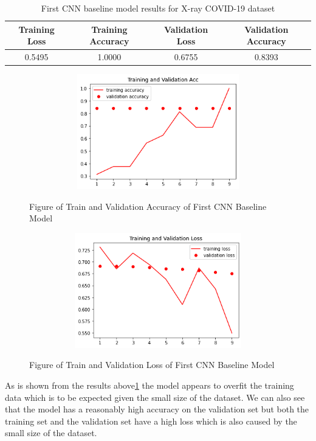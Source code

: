 \begin{table}[H]
    \centering
    \begin{tabular}{|c|c|c|c|}
    \hline
         Training Loss
         & Training Accuracy 
         & Validation Loss
         & Validation Accuracy\\
         \hline
         0.5495  & 1.0000 & 0.6755 & 0.8393\\
         \hline
    \end{tabular}
    \caption{First CNN baseline model results for X-ray COVID-19 dataset}
    \label{tab:First CNN baseline model results for X-ray COVID-19 dataset}
\end{table}
 \begin{figure}[H]
    \centering
    \includegraphics[width=1\textwidth,height=5cm,keepaspectratio]{Images/FirstCNNBaselineTrainAndValAcc.PNG}\\
    \caption{Figure of Train and Validation Accuracy of First CNN Baseline Model}
    \label{fig:First CNN Baseline Train and Validation Accuracy}
\end{figure}
 \begin{figure}[H]
    \centering
    \includegraphics[width=1\textwidth,height=5cm,keepaspectratio]{Images/FirstCNNBaselineTrainAndValLoss.PNG}\\
    \caption{Figure of Train and Validation Loss of First CNN Baseline Model}
    \label{fig:First CNN Baseline Train and Validation Loss}
\end{figure}
As is shown from the results above\ref{tab:First CNN baseline model results for X-ray COVID-19 dataset} the model appears to overfit the training data which is to be expected given the small size of the dataset.  We can also see that the model has a reasonably high accuracy on the validation set but both the training set and the validation set have a high loss which is also caused by the small size of the dataset.

